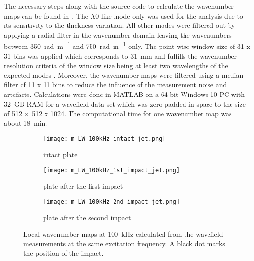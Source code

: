 \documentclass[times,final]{elsarticle}
\begin{document}
The necessary steps along with the source code to calculate the wavenumber maps can be found in~\cite{LUGOVTSOVA2021}. The A0-like mode only was used for the analysis due to its sensitivity to the thickness variation. All other modes were filtered out by applying a radial filter in the wavenumber domain leaving the wavenumbers between \SI{350}{\radian\per\meter} and \SI{750}{\radian\per\meter} only. The point-wise window size of 31 x 31 bins was applied which corresponds to \SI{31}{\milli\meter} and fulfills the wavenumber resolution criteria of the window size being at least two wavelengths of the expected modes \cite{ROGGE2013}. Moreover, the wavenumber maps were filtered using a median filter of 11 x 11 bins to reduce the influence of the measurement noise and artefacts. Calculations were done in MATLAB on a 64-bit Windows 10 PC with 32~GB RAM for a wavefield data set which was zero-padded in space to the size of 512 × 512 x 1024. The computational time for one wavenumber map was about \SI{18}{\minute}.

\begin{figure} [h]
	\centering
	\begin{subfigure}[b]{0.49\textwidth}
		\texttt{[image: m\_LW\_100kHz\_intact\_jet.png]}
		\caption{intact plate}
		\label{fig:LW_intact}
	\end{subfigure}
	\begin{subfigure}[b]{0.49\textwidth}
		\texttt{[image: m\_LW\_100kHz\_1st\_impact\_jet.png]}
		\caption{plate after the first impact}
		\label{fig:LW_1st_impact}
	\end{subfigure}
	\begin{subfigure}[b]{0.49\textwidth}
		\texttt{[image: m\_LW\_100kHz\_2nd\_impact\_jet.png]}
		\caption{plate after the second impact}
		\label{fig:LW_2nd_impact}
	\end{subfigure}
	\caption{Local wavenumber maps at \SI{100}{kHz} calculated from the wavefield measurements at the same excitation frequency. A black dot marks the position of the impact.}
	\label{fig:LW}
\end{figure}
\end{document}
